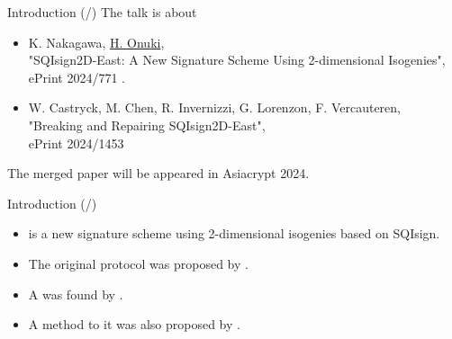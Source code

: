 \newcommand*{\introTotal}{\total{intro}}
\begin{frame}{Introduction (/\introTotal{})}
    The talk is about 

    \begin{itemize}
        \setlength{\itemsep}{10pt}
        \item K. Nakagawa, \underline{H. Onuki},\\
            "SQIsign2D-East: A New Signature Scheme Using 2-dimensional Isogenies",\\
            ePrint 2024/771
            \cite{no2024sqisign2d}.

        \item W. Castryck, M. Chen, R. Invernizzi, G. Lorenzon, F. Vercauteren,\\
                "Breaking and Repairing SQIsign2D-East",\\
                ePrint 2024/1453
                \cite{CCILV2024sqisign2d_attack}
    \end{itemize}

    \vspace{10pt}
    The merged paper will be appeared in Asiacrypt 2024.
\end{frame}

\begin{frame}{Introduction (/\introTotal{})}
    \begin{itemize}
        \setlength{\itemsep}{10pt}
        \item {} is a new signature scheme using 2-dimensional isogenies based on SQIsign.
        \item The original protocol was proposed by \cite{no2024sqisign2d}.
        \item A  was found by \cite{CCILV2024sqisign2d_attack}.
        \item A method to  it was also proposed by \cite{CCILV2024sqisign2d_attack}.
    \end{itemize}
\end{frame}

